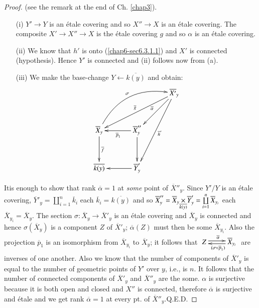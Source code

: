 \begin{proof}
(see the remark at the end of Ch. \ref{chap3}).

\begin{itemize}
\item[(i)] $Y'\to Y$ is an \'etale covering and so $X''\to X$ is an
  \'etale covering. The composite $X'\to X''\to X$ is the \'etale
  covering $g$ and so $\alpha$ is an \'etale covering.

\item[(ii)] We know that $h'$ is onto (\ref{chap6-sec6.3.1.1}) and $X'$ is
  connected (hypothesis). Hence $Y'$ is connected and (ii) follows now
  from (a).

\item[(iii)] We make the base-change $Y\leftarrow \overline{k(y)}$ and
  obtain: 
\[
\xymatrix@=1.2cm{
 & &
  \overline{X'}_{y}\ar[dl]_{\overline{\alpha}}\ar[ddl]^{\overline{h}'}\ar[dll]_{\overline{g}}\\ 
\overline{X}_{y}\ar[d]^{\overline{f}}\ar@/^2pc/[urr]^{\sigma} &
\overline{X}''_{y}\ar[l]^{\overline{p}_{1}}\ar[d]  &\\
\overline{k(y)} & \overline{Y}'_{y}\ar[l] &
}
\]
\end{itemize}

It\pageoriginale is enough to show that rank $\overline{\alpha}=1$ at
{\em some} point of $\overline{X}''_{y}$. Since $Y'/Y$ is an \'etale
covering, $\overline{Y}'_{y}=\coprod\limits^{n}_{i=1}\overline{k}_{i}$
each $\overline{k}_{i}=\overline{k(y)}$ and so
$\overline{X}''_{y}=\fprod{\overline{X}_{y}}{\overline{Y}'_{y}}{\overline{k(y)}}=\coprod\limits^{n}_{i=1}\overline{X}_{y_{i}}$
each $\overline{X}_{y_{i}}=\overline{X}_{y}$. The section
$\sigma:\overline{X}_{y}\to \overline{X}'_{y}$ is an \'etale covering
and $\overline{X}_{y}$ is connected and hence
$\sigma(\overline{X}_{y})$ is a component $Z$ of $\overline{X}'_{y}$;
$\overline{\alpha}(Z)$ must then be some $\overline{X}_{y_{i}}$. Also
the projection $\overline{p}_{1}$ is an isomorphism from
$\overline{X}_{y_{i}}$ to $\overline{X}_{y}$; it follows that 
$\xymatrix{Z\ar@<.2em>[r]^{\overline{\alpha}} &
  \overline{X}_{y_{i}}\ar@<.2em>[l]^{(\sigma\circ \overline{p}_{1})}}$
are inverses of one another. Also we know that the number of
components of $\overline{X}'_{y}$ is equal to the number of geometric
points of $Y'$ over $y$, i.e., is $n$. It follows that the number of
connected components of $\overline{X}'_{y}$ and $\overline{X}''_{y}$
are the some. $\alpha$ is surjective because it is both open and
closed and $X''$ is connected, therefore $\overline{\alpha}$ is
surjective and \'etale and we get rank $\overline{\alpha}=1$ at every
pt. of $\overline{X}''_{y}$.\hfill Q.E.D.
\end{proof}

